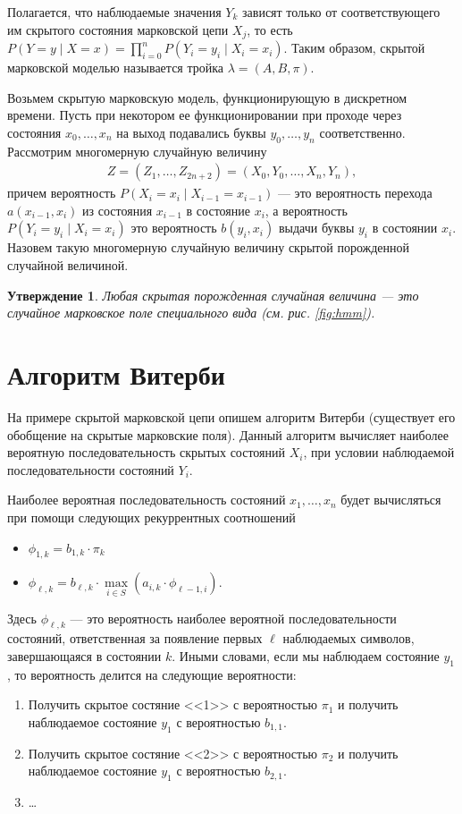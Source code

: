 \documentclass[12pt]{article}
\newtheorem{utv}{Утверждение}
\begin{document}
Полагается, что наблюдаемые значения $Y_k$ зависят только от соответствующего им скрытого состояния марковской цепи $X_j$, то есть $P(Y = y \mid X = x) = \prod\limits_{i = 0}^{n} P(Y_i = y_i \mid X_i = x_i)$. Таким образом, скрытой
марковской моделью называется тройка $\lambda = (A, B, \pi)$.

Возьмем скрытую марковскую модель, функционирующую в дискретном времени. Пусть при некотором ее функционировании при проходе через состояния $x_0, \ldots, x_n$ на выход подавались буквы $y_0, \ldots, y_n$ соответственно. Рассмотрим многомерную случайную
величину
\begin{gather*}
Z = (Z_1, \ldots, Z_{2n + 2}) = (X_0, Y_0, \ldots, X_n, Y_n),
\end{gather*}
причем вероятность $P(X_i = x_i \mid X_{i-1} = x_{i-1})$ --- это вероятность перехода $a(x_{i-1}, x_{i})$ из состояния $x_{i-1}$ в состояние $x_i$, а вероятность $P(Y_i  = y_i \mid X_i = x_i)$ это вероятность $b(y_i, x_i)$ выдачи буквы $y_i$ в состоянии $x_i$. Назовем такую многомерную случайную величину скрытой порожденной случайной величиной.


\begin{utv}
Любая скрытая порожденная случайная величина — это случайное марковское поле специального вида (см. рис. \ref{fig:hmm}).
\end{utv}
\section{Алгоритм Витерби}
На примере скрытой марковской цепи опишем алгоритм Витерби (существует его обобщение на скрытые марковские поля).
Данный алгоритм вычисляет наиболее вероятную последовательность скрытых состояний $X_i$, при условии наблюдаемой последовательности состояний $Y_i$. 

Наиболее вероятная последовательность состояний $x_1, \ldots, x_n$ будет вычисляться при помощи следующих рекуррентных соотношений
\begin{itemize}
\item $\phi_{1,k} = b_{1,k} \cdot \pi_k$
\item $\phi_{\ell,k} = b_{\ell,k} \cdot \max\limits_{i \in S} (a_{i, k} \cdot \phi_{\ell-1, i})$.
\end{itemize}
Здесь $\phi_{\ell, k}$ — это вероятность наиболее вероятной последовательности состояний, ответственная за появление первых $\ell$ наблюдаемых символов, завершающаяся в состоянии $k$.
Иными словами, если мы наблюдаем состояние $y_1$, то вероятность делится на следующие вероятности:
\begin{enumerate}
\item Получить скрытое состяние <<1>> с вероятностью $\pi_1$ и получить наблюдаемое состояние $y_1$ с вероятностью $b_{1,1}$.
\item Получить скрытое состяние <<2>> с вероятностью $\pi_2$ и получить наблюдаемое состояние $y_1$ с вероятностью $b_{2,1}$.
\item \ldots
\end{enumerate}
\end{document}
